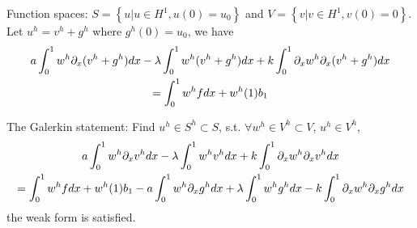 \begin{solution}
	Function spaces: $S = \left \{ u \Big| u \in H^1, u(0) = u_0 \right \}$ and $V = \left \{ v \Big| v \in H^1, v(0) = 0 \right \}$. Let $u^h = v^h + g^h$ where $g^h(0)=u_0$, we have
	\begin{gather}
		a\int_0^1 w^h\partial_{x}(v^h + g^h) dx - \lambda \int_0^1 w^h (v^h + g^h) dx + k \int_0^1 \partial_{x}w^h \partial_{x}(v^h + g^h) dx \notag \\
		= \int_0^1 w^h f dx + w^{h}(1)b_1
	\end{gather}
	
	\begin{tcolorbox}
		The Galerkin statement: Find $u^h \in S^h \subset S$, s.t. $\forall w^h \in V^h \subset V$, $u^h \in V^h$, 
		\begin{gather*}
			a\int_0^1 w^h\partial_{x}v^h dx - \lambda \int_0^1 w^h v^h dx + k \int_0^1 \partial_{x}w^h \partial_{x}v^h dx \notag \\
		= \int_0^1 w^h f dx + w^{h}(1)b_1 - a\int_0^1 w^h\partial_{x}g^h dx + \lambda \int_0^1 w^h g^h dx - k \int_0^1 \partial_{x}w^h \partial_{x}g^h dx
		\end{gather*}
		the weak form is satisfied. 	
	\end{tcolorbox}
	
\end{solution}